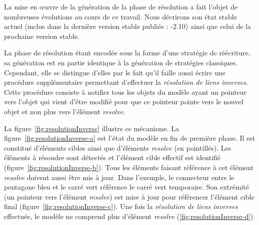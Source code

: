 La mise en œuvre de la génération de la phase de résolution a fait l'objet de
nombreuses évolutions au cours de ce travail. Nous décrirons son état stable
actuel (inclus dans la dernière version stable publiée : {\tom}-2.10) ainsi que
celui de la prochaine version stable.

La phase de résolution étant encodée sous la forme d'une stratégie de
réécriture, sa génération est en partie identique à la génération de stratégies
classiques. Cependant, elle se distingue d'elles par le fait qu'il faille aussi
écrire une procédure supplémentaire permettant d'effectuer la \emph{résolution
de liens inverses}. Cette procédure consiste à notifier tous les objets du
modèle ayant un pointeur vers l'objet qui vient d'être modifié pour que ce
pointeur pointe vers le nouvel objet et non plus vers l'élément \emph{resolve}.

La figure~\ref{fig:resolutionInverse} illustre ce mécanisme. La
figure~\ref{fig:resolutionInverse-a} est l'état du modèle en fin de première
phase. Il est constitué d'éléments cibles ainsi que d'éléments \emph{resolve}
(en pointillés). Les éléments à résoudre sont détectés et l'élément cible
effectif est identifié (figure~\ref{fig:resolutionInverse-b}).  Tous les
éléments faisant référence à cet élément \emph{resolve} doivent aussi être mis
à jour.  Dans l'exemple, le connecteur entre le pentagone bleu et le carré vert
référence le carré vert temporaire. Son extrémité (un pointeur vers l'élément
\emph{resolve}) est mise à jour pour référencer l'élément cible final
(figure~\ref{fig:resolutionInverse-c}). Une fois la \emph{résolution de liens
inverses} effectuée, le modèle ne comprend plus d'élément \emph{resolve}
(\ref{fig:resolutionInverse-d}).

